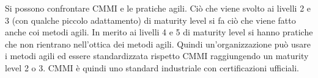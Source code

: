 Si possono confrontare CMMI e le pratiche agili. Ciò che viene svolto ai livelli
2 e 3 (con qualche piccolo adattamento) di maturity level si fa ciò che viene
fatto anche coi metodi agili. In merito ai livelli 4 e 5 di maturity level si hanno
pratiche che non rientrano nell'ottica dei metodi agili. Quindi un'organizzazione
può usare i metodi agili ed essere standardizzata rispetto CMMI raggiungendo
un maturity level 2 o 3. CMMI è quindi uno standard industriale con certificazioni
ufficiali.